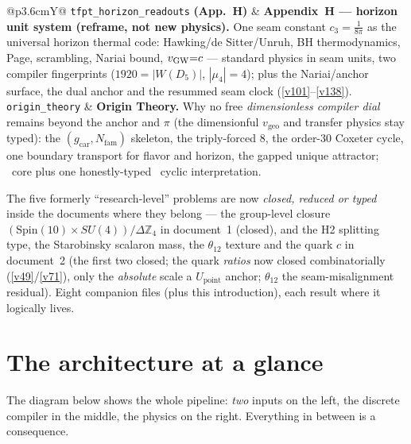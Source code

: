 \documentclass[11pt,a4paper]{article}
\newcommand{\cthree}{c_3}
\newcommand{\gcar}{g_{\mathrm{car}}}
\newcommand{\Nfam}{N_{\mathrm{fam}}}
\newcommand{\Z}{\mathbb{Z}}
\begin{document}
\begin{center}
\begin{tabularx}{\linewidth}{@{}p{3.6cm}Y@{}}
\texttt{tfpt\_horizon\_readouts} \textbf{(App.~H)} & \textbf{Appendix~H --- horizon unit system (reframe, not new physics).} One seam constant $\cthree{=}\tfrac1{8\pi}$ as the universal horizon thermal code: Hawking/de Sitter/Unruh, BH thermodynamics, Page, scrambling, Nariai bound, $v_{\rm GW}{=}c$ --- standard physics in seam units, two compiler fingerprints ($1920{=}|W(D_5)|$, $|\mu_4|{=}4$); plus the Nariai/anchor surface, the dual anchor and the resummed seam clock (\vref{v101}--\vref{v138}). \\
\texttt{origin\_theory} & \textbf{Origin Theory.} Why no free \emph{dimensionless compiler dial} remains beyond the anchor and $\pi$ (the dimensionful $v_{\mathrm{geo}}$ and transfer physics stay typed): the $(\gcar,\Nfam)$ skeleton, the triply-forced $8$, the order-$30$ Coxeter cycle, one boundary transport for flavor and horizon, the gapped unique attractor; \mE\ core plus one honestly-typed \mC\ cyclic interpretation. \\
\bottomrule
\end{tabularx}
\end{center}

\noindent The five formerly ``research-level'' problems are now \emph{closed, reduced or typed} inside the
documents where they belong --- the group-level closure $(\mathrm{Spin}(10){\times}SU(4))/\Delta\Z_4$ in
document~1 (closed), and the H2 splitting type, the Starobinsky scalaron mass, the $\theta_{12}$ texture and
the quark $c$ in document~2 (the first two closed; the quark \emph{ratios} now closed combinatorially
(\vref{v49}/\vref{v71}), only the \emph{absolute} scale a $U_{\mathrm{point}}$ anchor; $\theta_{12}$ the
seam-misalignment residual). Eight companion files (plus this introduction), each result
where it logically lives.

\section{The architecture at a glance}
The diagram below shows the whole pipeline: \emph{two} inputs on the left, the discrete compiler in the
middle, the physics on the right. Everything in between is a consequence.
\end{document}
